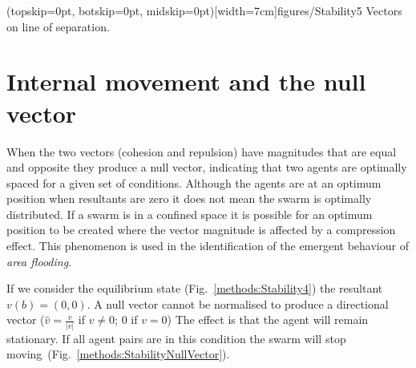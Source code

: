 \documentclass{ieeeaccess}
\begin{document}

\Figure[t!](topskip=0pt, botskip=0pt, midskip=0pt)[width=7cm]{figures/Stability5}
{Vectors on line of separation.\label{methods:Stability5}}


\section{Internal movement and the null vector}\label{Section:StabilityNullVector}
When the two vectors (cohesion and repulsion) have magnitudes that are equal and opposite they produce a null vector, indicating that two agents are optimally spaced for a given set of conditions. Although the agents are at an optimum position when resultants are zero it does not mean the swarm is optimally distributed. If a swarm is in a confined space it is possible for an optimum position to be created where the vector magnitude is affected by a compression effect. This phenomenon is used in the identification of the emergent behaviour of \textit{area flooding}.  

If we consider the equilibrium state (Fig.~\ref{methods:Stability4}) the resultant $v(b)=(0,0)$. A null vector cannot be normalised to produce a directional vector ($\hat{v} = \frac{v}{|v|}$ if $v\neq0$; $0$ if $v=0$) The effect is that the agent will remain stationary. If all agent pairs are in this condition the swarm will stop moving~(Fig.~\ref{methods:StabilityNullVector}).
\end{document}
